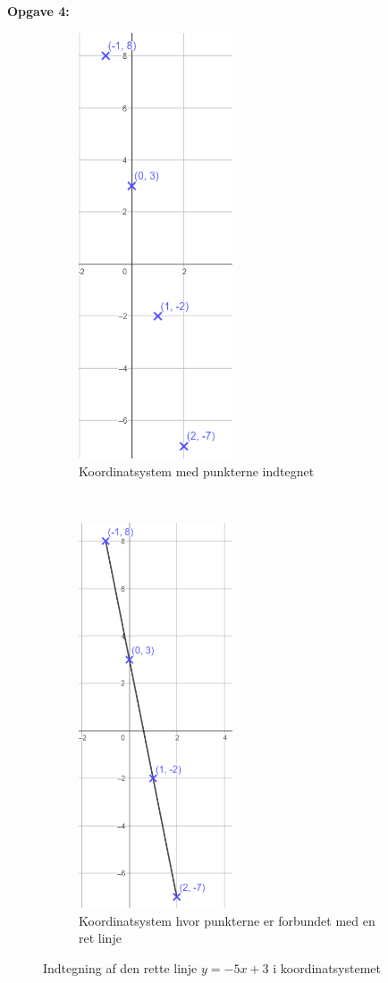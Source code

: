 \textbf{Opgave 4:}

\begin{figure}[ht]
    \centering
    \begin{subfigure}[t]{0.5\textwidth}
        \centering
        \includegraphics[width=0.5\textwidth, height=0.7\textwidth]{img_9}
        \caption{Koordinatsystem med punkterne indtegnet}
    \end{subfigure}%
    ~ 
    \begin{subfigure}[t]{0.5\textwidth}
        \centering
        \includegraphics[width=0.5\textwidth, height=0.7\textwidth]{img_10}
        \caption{Koordinatsystem hvor punkterne er forbundet med en ret linje}
    \end{subfigure}
    \caption{Indtegning af den rette linje $y = -5x + 3 $ i koordinatsystemet}
\end{figure}

